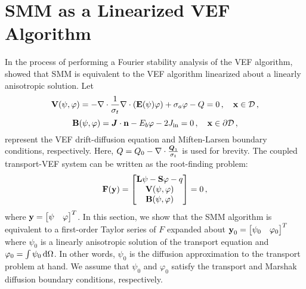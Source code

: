 \documentclass[../doc.tex]{subfiles}
\begin{document}
\section{SMM as a Linearized VEF Algorithm} \label{moment_sec:linearize}
In the process of performing a Fourier stability analysis of the VEF algorithm, \textcite{cefus} showed that SMM is equivalent to the VEF algorithm linearized about a linearly anisotropic solution. Let 
	\begin{equation}
		\boldsymbol{\mathrm{V}}(\psi,\varphi) = -\nabla\cdot\frac{1}{\sigma_t}\nabla\cdot\left( \boldsymbol{\mathrm{E}}(\psi)\varphi \right) + \sigma_a \varphi - Q = 0 \,, \quad \boldsymbol{\mathrm{x}} \in \mathcal{D} \,,
	\end{equation}
	\begin{equation}
		\boldsymbol{\mathrm{B}}(\psi,\varphi) = \boldsymbol{J}\cdot\boldsymbol{\mathrm{n}} - E_b \varphi - 2J_\text{in} = 0 \,, \quad \boldsymbol{\mathrm{x}} \in \partial\mathcal{D} \,,
	\end{equation}
represent the VEF drift-diffusion equation and Miften-Larsen boundary conditions, respectively. Here, $Q = Q_0 - \nabla\cdot\frac{\boldsymbol{Q}_1}{\sigma_t}$ is used for brevity. The coupled transport-VEF system can be written as the root-finding problem: 
	\begin{equation} \label{moment:vef_root}
		\boldsymbol{\mathrm{F}}(\boldsymbol{\mathrm{y}}) = \begin{bmatrix} 
			\boldsymbol{\mathrm{L}}\psi - \boldsymbol{\mathrm{S}}\varphi - q \\ 
			\boldsymbol{\mathrm{V}}(\psi,\varphi) \\ 
			\boldsymbol{\mathrm{B}}(\psi,\varphi)
		\end{bmatrix}
		= 0 \,, 
	\end{equation}
where $\boldsymbol{\mathrm{y}} = \begin{bmatrix} \psi & \varphi \end{bmatrix}^T$. In this section, we show that the SMM algorithm is equivalent to a first-order Taylor series of $F$ expanded about $\boldsymbol{\mathrm{y}}_0 = \begin{bmatrix} \psi_0 & \varphi_0 \end{bmatrix}^T$ where $\psi_0$ is a linearly anisotropic solution of the transport equation and $\varphi_0 = \int \psi_0 \mathop{}\!\mathrm{d} \Omega$. In other words, $\psi_0$ is the diffusion approximation to the transport problem at hand. We assume that $\psi_0$ and $\varphi_0$ satisfy the transport and Marshak diffusion boundary conditions, respectively. 
\end{document}
